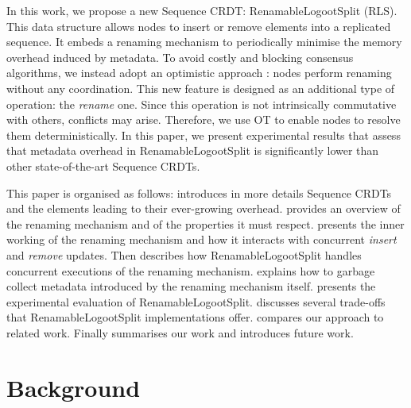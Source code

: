 \documentclass[10pt,journal,compsoc]{IEEEtran}
\begin{document}
In this work, we propose a new Sequence \ac{CRDT}: RenamableLogootSplit (RLS).
This data structure allows nodes to insert or remove elements into a replicated sequence.
It embeds a renaming mechanism to periodically minimise the memory overhead induced by metadata.
To avoid costly and blocking consensus algorithms, we instead adopt an optimistic approach : nodes perform renaming without any coordination.
This new feature is designed as an additional type of operation: the \emph{rename} one.
Since this operation is not intrinsically commutative with others, conflicts may arise.
Therefore, we use \ac{OT} \cite{10.1145/67544.66963,10.1145/289444.289469,4668339} to enable nodes to resolve them deterministically.
In this paper, we present experimental results that assess that metadata overhead in RenamableLogootSplit is significantly lower than other state-of-the-art Sequence \acp{CRDT}.

This paper is organised as follows:
 introduces in more details Sequence \acp{CRDT} and the elements leading to their ever-growing overhead.
 provides an overview of the renaming mechanism and of the properties it must respect.
 presents the inner working of the renaming mechanism and how it interacts with concurrent \emph{insert} and \emph{remove} updates.
Then  describes how RenamableLogootSplit handles concurrent executions of the renaming mechanism.
 explains how to garbage collect metadata introduced by the renaming mechanism itself.
 presents the experimental evaluation of RenamableLogootSplit.
 discusses several trade-offs that RenamableLogootSplit implementations offer.
 compares our approach to related work.
Finally  summarises our work and introduces future work.


\section{Background}
\label{sec:background}
\end{document}
